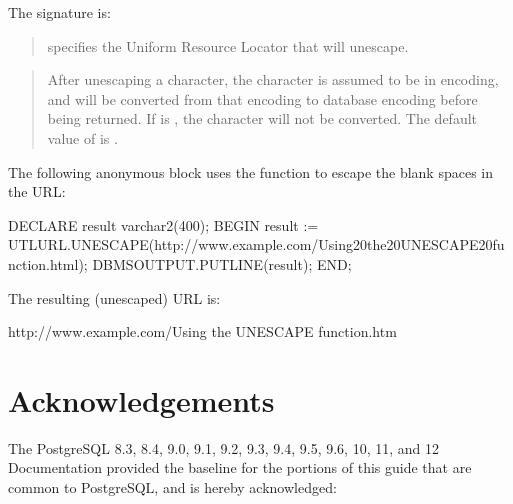 \documentclass[letterpaper,10pt,english,openany,oneside]{sphinxmanual}
\begin{document}
The signature is:
\begin{quote}

\end{quote}


\begin{quote}

 specifies the Uniform Resource Locator that  will
unescape.
\end{quote}

\begin{quote}

After unescaping a character, the character is assumed to be in
 encoding, and will be converted from that encoding to
database encoding before being returned. If  is
, the character will not be converted. The default value of
 is .
\end{quote}


The following anonymous block uses the  function to escape the
blank spaces in the URL:

%
\begin{sphinxVerbatim}[commandchars=\\\{\}]
   DECLARE
   result varchar2(400);
   BEGIN
result := UTL\PYGZus{}URL.UNESCAPE(\PYGZsq{}http://www.example.com/Using\PYGZpc{}20the\PYGZpc{}20UNESCAPE\PYGZpc{}20function.html\PYGZsq{});
   DBMS\PYGZus{}OUTPUT.PUT\PYGZus{}LINE(result);
   END;
\end{sphinxVerbatim}

The resulting (unescaped) URL is:

%
\begin{sphinxVerbatim}[commandchars=\\\{\}]
http://www.example.com/Using the UNESCAPE function.htm
\end{sphinxVerbatim}


\chapter{Acknowledgements}
\label{\detokenize{acknowledgements:acknowledgements}}\label{\detokenize{acknowledgements::doc}}
The PostgreSQL 8.3, 8.4, 9.0, 9.1, 9.2, 9.3, 9.4, 9.5, 9.6, 10, 11, and
12 Documentation provided the baseline for the portions of this guide
that are common to PostgreSQL, and is hereby acknowledged:
\end{document}
